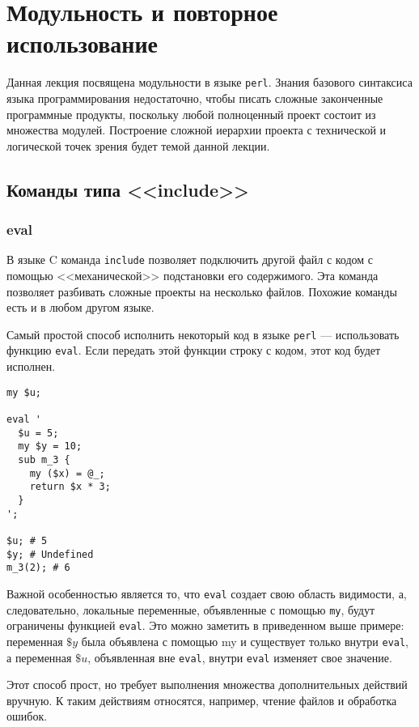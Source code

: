 \setcounter{chapter}{2}
\chapter{Модульность и повторное использование}
Данная лекция посвящена модульности в языке \verb|perl|. Знания базового синтаксиса языка программирования недостаточно, чтобы писать сложные законченные программные продукты, поскольку любой полноценный проект состоит из множества модулей. Построение сложной иерархии проекта с технической и логической точек зрения будет темой данной лекции.

\section{Команды типа <<include>>} %

\subsection{eval}
В языке C команда \verb|include| позволяет подключить другой файл с кодом с помощью <<механической>> подстановки его содержимого. Эта команда позволяет разбивать сложные проекты на несколько файлов. Похожие команды есть и в любом другом языке.

Самый простой способ исполнить некоторый код в языке \verb|perl| --- использовать функцию \verb|eval|. Если передать этой функции строку с кодом, этот код будет исполнен.
\begin{verbatim}
my $u;

eval '
  $u = 5;
  my $y = 10;
  sub m_3 {
    my ($x) = @_;
    return $x * 3;
  }
';

$u; # 5
$y; # Undefined
m_3(2); # 6
\end{verbatim}
Важной особенностью является то, что \verb|eval| создает свою область видимости, а, следовательно, локальные переменные, объявленные с помощью \verb|my|, будут ограничены функцией \verb|eval|. Это можно заметить в приведенном выше примере: переменная $\$y$ была объявлена с помощью my и существует только внутри \verb|eval|, а переменная $\$u$, объявленная вне \verb|eval|, внутри \verb|eval| изменяет свое значение.

Этот способ прост, но требует выполнения множества дополнительных действий вручную. К таким действиям относятся, например, чтение файлов и обработка ошибок.

